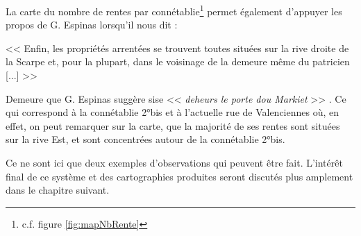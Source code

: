 La carte du nombre de rentes par connétablie\footnote{c.f. figure \ref{fig:mapNbRente}} permet également d'appuyer les propos de G. Espinas lorsqu'il nous dit : 
\begin{displayquote}
    << Enfin, les propriétés arrentées se trouvent toutes situées sur la rive droite de la Scarpe et, pour la plupart, dans le voisinage de la demeure même du patricien [...] >> 
\end{displayquote} 
Demeure que G. Espinas suggère sise << \textit{deheurs le porte dou Markiet} >> \parencite{espinas_les_1933}. Ce qui correspond à la connétablie 2°bis et à l'actuelle rue de Valenciennes où, en effet, on peut remarquer sur la carte, que la  majorité de ses rentes sont situées sur la rive Est, et sont concentrées autour de la connétablie 2°bis.

Ce ne sont ici que deux exemples d'observations qui peuvent être fait. L'intérêt final de ce système et des cartographies produites seront discutés plus amplement dans le chapitre suivant.


